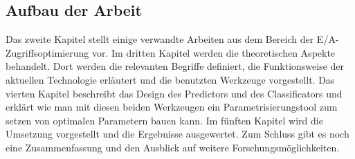 



\subsection{Aufbau der Arbeit}
Das zweite Kapitel stellt einige verwandte Arbeiten aus dem Bereich der E/A-Zugriffsoptimierung vor. 
Im dritten Kapitel werden die theoretischen Aspekte behandelt. 
Dort werden die relevanten Begriffe definiert, die Funktionsweise der aktuellen Technologie erläutert und die benutzten Werkzeuge vorgestellt. 
Das vierten Kapitel beschreibt das Design des Predictors und des Classificators und erklärt wie man mit diesen beiden Werkzeugen ein Parametrisierungstool zum setzen von optimalen Parametern bauen kann.
Im fünften Kapitel wird die Umsetzung vorgestellt und die Ergebnisse ausgewertet. Zum Schluss gibt es noch eine Zusammenfassung und den Ausblick auf weitere Forschungsmöglichkeiten.
